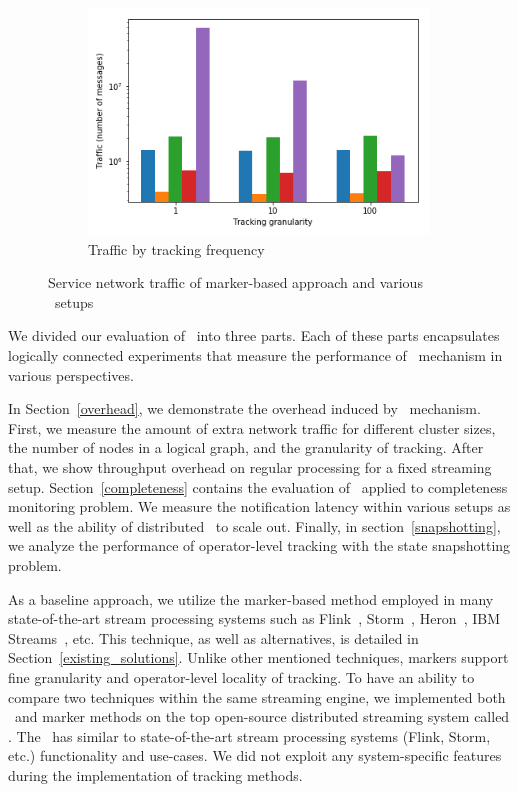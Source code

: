 \begin{figure}[t!]
\begin{subfigure}[b]{0.32\textwidth}
            \includegraphics[width=0.99\textwidth]{pics/traffic_by_tracking_frequency_bars.png}
            \caption{Traffic by tracking frequency}
            \label{traffic_granularity}
	\end{subfigure}
    \caption{Service network traffic of marker-based approach and various \tracker\ setups}
    \label{traffic_plots}
\end{figure}

\label {fs-acker-experiments}

We divided our evaluation of \tracker\ into three parts. Each of these parts encapsulates logically connected experiments that measure the performance of \tracker\ mechanism in various perspectives.

In Section~\ref{overhead}, we demonstrate the overhead induced by \tracker\ mechanism. First, we measure the amount of extra network traffic for different cluster sizes, the number of nodes in a logical graph, and the granularity of tracking. 
After that, we show throughput overhead on regular processing for a fixed streaming setup. Section~\ref{completeness} contains the evaluation of \tracker\ applied to completeness monitoring problem. 
We measure the notification latency within various setups as well as the ability of distributed \tracker\ to scale out. 
Finally, in section~\ref{snapshotting}, we analyze  the performance of operator-level tracking with the state snapshotting problem. 

As a baseline approach, we utilize the marker-based method employed in many state-of-the-art stream processing systems such as Flink~\cite{Carbone:2017:SMA:3137765.3137777}, Storm~\cite{apache:storm:state}, Heron~\cite{Kulkarni:2015:THS:2723372.2742788}, IBM Streams~\cite{jacques2016consistent}, etc. This technique, as well as alternatives, is detailed in Section~\ref{existing_solutions}. 
Unlike other mentioned techniques, markers support fine granularity and operator-level locality of tracking. 
To have an ability to compare two techniques within the same streaming engine, we implemented both \tracker\ and marker methods on the top open-source distributed streaming system called \FlameStream. The  \FlameStream\ has similar to state-of-the-art stream processing systems (Flink, Storm, etc.) functionality and use-cases. 
We did not exploit any system-specific features during the implementation of tracking methods.

